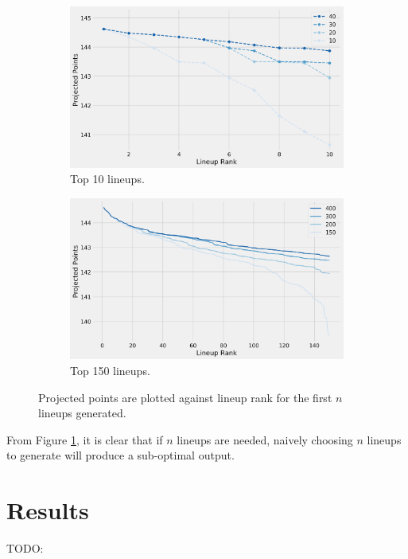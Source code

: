 \documentclass[12pt]{article}
\begin{document}
\begin{figure}[H]
  \centering
  \begin{subfigure}[b]{0.80\textwidth}
    \centering
    \includegraphics[width=1\textwidth]{../figures/lineups10_vs_n}
    \caption{Top 10 lineups.}
  \end{subfigure}
  \par\bigskip
  \begin{subfigure}[b]{0.80\textwidth}
    \centering
    \includegraphics[width=1\textwidth]{../figures/lineups150_vs_n}
    \caption{Top 150 lineups.}
  \end{subfigure}
  \caption{Projected points are plotted against lineup rank for the first $n$ lineups generated.}
\label{lineups_vs_n}
\end{figure}

From Figure \ref{lineups_vs_n}, it is clear that if $n$ lineups are needed, naively choosing $n$ lineups to generate will produce a sub-optimal output.

\pagebreak
\section{Results}
TODO: 
\end{document}
